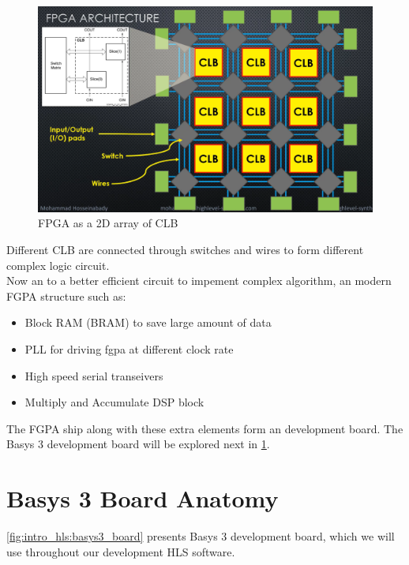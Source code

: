 \begin{figure}[h]
\centering
\includegraphics[scale=0.35,frame]{Figures/intro_hls/2d_CLB}
\caption{FPGA as a 2D array of CLB}
\label{fig:intro_hls:2d_CLB}
\end{figure} 

Different CLB are connected through switches and wires to form different complex logic circuit.\\

Now an to a better efficient circuit to impement complex algorithm, an modern FGPA structure  such as:

\begin{itemize}

\item Block RAM (BRAM) to save large amount of data

\item PLL for driving fgpa at different clock rate

\item High speed serial transeivers

\item Multiply and Accumulate DSP block

\end{itemize}

The FGPA ship along with these extra elements form an development board. The Basys 3 development board will be explored next in \ref{sec:Basys3_board}.

\section{Basys 3 Board Anatomy}
\label{sec:Basys3_board}

\autoref{fig:intro_hls:basys3_board} presents Basys 3 development board, which we will use throughout our development HLS software.

